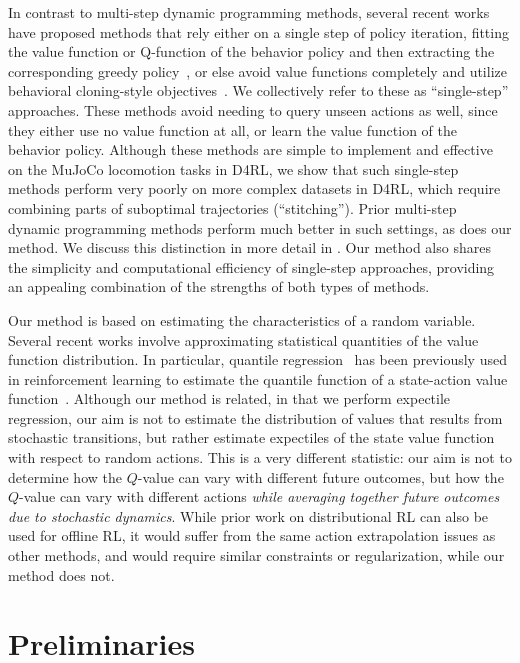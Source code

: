 \documentclass{article} %
\begin{document}
In contrast to multi-step dynamic programming methods, several recent works have proposed methods that rely either on a single step of policy iteration, fitting the value function or Q-function of the behavior policy and then extracting the corresponding greedy policy~\citep{peng2019advantage,brandfonbrener2021offline}, or else avoid value functions completely and utilize behavioral cloning-style objectives~\citep{chen2021decision}. We collectively refer to these as ``single-step''
approaches. These methods avoid needing to query unseen actions as well, since they either use no value function at all, or learn the value function of the behavior policy. Although these methods are simple to implement and effective on the MuJoCo locomotion tasks in D4RL, we show that such single-step methods perform very poorly on more complex datasets in D4RL, which require combining parts of suboptimal trajectories (``stitching''). Prior multi-step dynamic programming methods perform much better in such settings, as does our method. We discuss this distinction in more detail in . Our method also shares the simplicity and computational efficiency of single-step approaches, providing an appealing combination of the strengths of both types of methods.

Our method is based on estimating the characteristics of a random variable. Several recent works involve approximating statistical quantities of the value function distribution. In particular, quantile regression~\citep{koenker2001quantile} has been previously used in reinforcement learning to estimate the quantile function of a state-action value function~\citep{dabney2018distributional, dabney2018implicit,kuznetsov2020controlling}.
Although our method is related, in that we perform expectile regression, our aim is not to estimate the distribution of values that results from stochastic transitions, but rather estimate expectiles of the state value function with respect to random actions.
This is a very different statistic: our aim is not to determine how the $Q$-value can vary with different future outcomes, but how the $Q$-value can vary with different actions \emph{while averaging together future outcomes due to stochastic dynamics}. While prior work on distributional RL can also be used for offline RL, it would suffer from the same action extrapolation issues as other methods, and would require similar constraints or regularization, while our method does not.



\section{Preliminaries}
\end{document}
